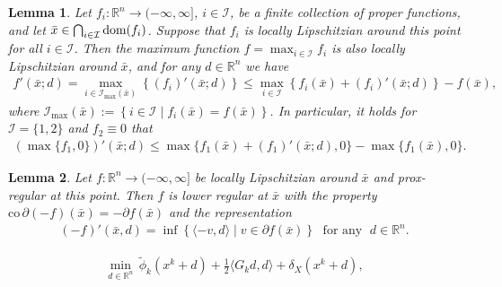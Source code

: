 \documentclass[10pt,a4paper]{amsart}
\newtheorem{lemma}{Lemma}
\begin{document}
\begin{lemma}\label{max rule}
Let \( f_i: \mathbb{R}^n \to (-\infty,\infty ] \), \( i \in \mathcal{I} \), be a finite collection of proper functions, and let \( \bar{x} \in \bigcap_{i \in \mathcal{I}} \text{\rm dom}(f_i) \). Suppose that \( f_i \) is locally Lipschitzian around this point for all \( i \in \mathcal{I} \). Then the maximum function  
\( f = \max_{i \in \mathcal{I}} f_i \) is also locally Lipschitzian around \( \bar{x} \), and for any \( d \in \mathbb{R}^n \) we have 
\begin{equation}\label{max rule formula}
\begin{aligned}
f'(\bar{x}; d) = \max_{i \in \mathcal{I}_{\max}(\bar{x})} \left\{ (f_i)'(\bar{x}; d) \right\} \leq 
\max_{i \in \mathcal{I}} \left\{ f_i(\bar{x}) + (f_i)'(\bar{x}; d) \right\} - f(\bar{x}),
\end{aligned}
\end{equation}  
where \( \mathcal{I}_{\max}(\bar{x}) := \left\{ i \in \mathcal{I} \mid f_i(\bar{x}) = f(\bar{x}) \right\} \).  
In particular, it holds for \( \mathcal{I} = \{1, 2\} \) and \( f_2 \equiv 0 \) that
\begin{equation*}
\begin{aligned}
\left( \max\{f_1, 0\} \right)'(\bar{x}; d) \leq \max\{ f_1(\bar x) + (f_1)'(\bar{x}; d), 0 \} - \max\{ f_1(\bar x), 0 \}.
\end{aligned}
\end{equation*}
\end{lemma}

\begin{lemma}\label{minus prox regular}
Let $f:\mathbb{R}^n\to(-\infty,\infty]$ be locally Lipschitzian around $\bar x$ and prox-regular at this point. Then $f$ is lower regular at $\bar x$ with the property $\mathrm{co}\,\partial(-f)(\bar x) = -\partial f(\bar x)$ and the representation
\begin{equation*}
\begin{aligned}
(-f)'(\bar x,d) = \inf\left\{\langle -v,d \rangle \mid v \in \partial f(\bar x)\right\}\;\mbox{ for any }\;d\in\mathbb{R}^n.
\end{aligned}
\end{equation*}
\end{lemma}

\begin{equation}\label{direction_sub}
\begin{aligned}
\min_{d \in \mathbb{R}^n} \, \tilde{ \phi}_{k}(x^k +d) + {\frac{1}{2} \langle G_kd,d\rangle} + \delta_X(x^k + d),
\end{aligned}
\end{equation}
\end{document}
